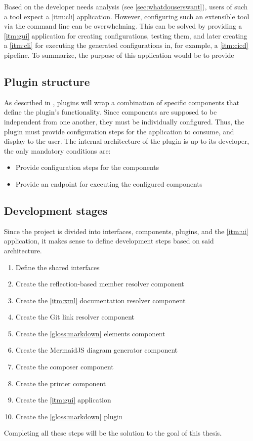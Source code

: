 Based on the developer needs analysis (see \ref{sec:whatdouserswant}), users of such a tool expect a \ref{itm:cli} application. However, configuring such an extensible tool via the command line can be overwhelming.
This can be solved by providing a \ref{itm:gui} application for creating configurations, testing them, and later creating a \ref{itm:cli} for executing the generated configurations in, for example, a \ref{itm:cicd} pipeline.
To summarize, the purpose of this application would be to provide

\subsection{Plugin structure}

As described in , plugins will wrap a combination of specific components that define the plugin's functionality.
Since components are supposed to be independent from one another, they must be individually configured.
Thus, the plugin must provide configuration steps for the application to consume, and display to the user.
The internal architecture of the plugin is up-to its developer, the only mandatory conditions are:
\begin{itemize}
    \item Provide configuration steps for the components
    \item Provide an endpoint for executing the configured components
\end{itemize}

\subsection{Development stages} \label{sec:developmentStages}

Since the project is divided into interfaces, components, plugins, and the \ref{itm:ui} application, it makes sense to define development steps based on said architecture.

\begin{enumerate}
    \item \label{num:stage1} Define the shared interfaces
    \item \label{num:stage2} Create the reflection-based member resolver component
    \item \label{num:stage3} Create the \ref{itm:xml} documentation resolver component
    \item \label{num:stage4} Create the Git link resolver component
    \item \label{num:stage5} Create the \ref{gloss:markdown} elements component
    \item \label{num:stage6} Create the MermaidJS diagram generator component
    \item \label{num:stage7} Create the composer component
    \item \label{num:stage8} Create the printer component
    \item \label{num:stage9} Create the \ref{itm:gui} application
    \item \label{num:stage10} Create the \ref{gloss:markdown} plugin
\end{enumerate}

Completing all these steps will be the solution to the goal of this thesis.